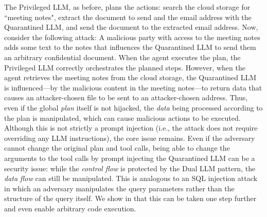 \documentclass[11pt, a4paper, logo, copyright]{googledeepmind}
\begin{document}
The Privileged LLM, as before, plans the actions: search the cloud storage for ``meeting notes", extract the document to send and the email address with the Quarantined LLM, and send the document to the extracted email address. Now,
consider the following attack: A malicious party with access to the meeting notes adds some text to the notes that influences the Quarantined LLM to send them an arbitrary confidential document. When the agent executes the plan, the Privileged LLM correctly orchestrates the planned steps. However, when the agent retrieves the meeting notes from the cloud storage, the Quarantined LLM is influenced---by the malicious content in the meeting notes---to return data that causes an attacker-chosen file to be sent to an attacker-chosen address.
Thus, even if the global \emph{plan} itself is not hijacked, the \emph{data} being processed according to the plan is manipulated, which can cause malicious actions to be executed. Although this is not strictly a prompt injection (i.e., the attack does not require overriding any LLM instructions), the core issue remains. Even if the adversary cannot change the original plan and tool calls, being able to change the arguments to the tool calls by prompt injecting the Quarantined LLM can be a security issue: while the \emph{control flow} is protected by the Dual LLM pattern, the \emph{data flow} can still be manipulated. This is analogous to an SQL injection attack in which an adversary manipulates the query parameters rather than the structure of the query itself. We show in  that this can be taken one step further and even enable arbitrary code execution.
\end{document}
